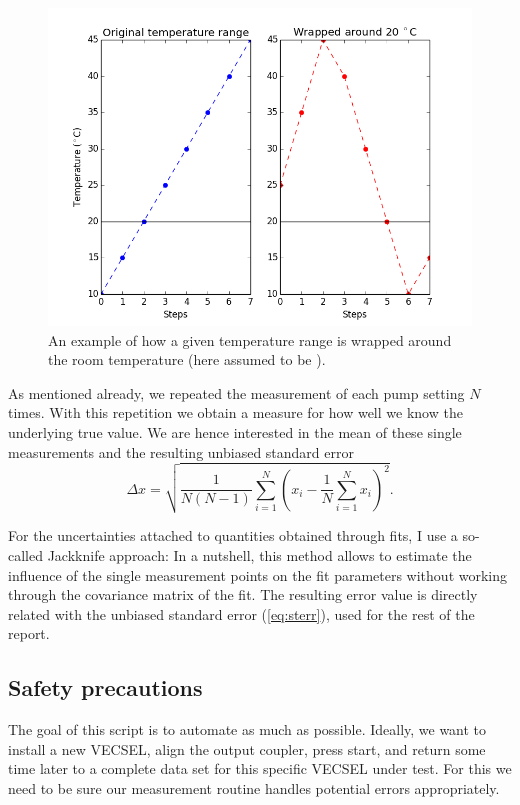 \begin{figure}
\centering
\includegraphics[width=12.5cm]{img/temp_wrap.png}
\caption{An example of how a given temperature range is wrapped around the room temperature
(here assumed to be ).}
\label{img:temproutine}
\end{figure}

As mentioned already,
we repeated the measurement of each pump setting
$N$ times.
With this repetition we obtain a measure
for how well we know
the underlying true value.
We are hence interested in
the mean of these single measurements and
the resulting unbiased standard error \cite{Barlow}
\begin{equation}
\Delta x = \sqrt{ \frac{1}{N(N-1)}
	\sum\limits_{i=1}^N (x_i - 
		\frac{1}{N} \sum\limits_{i=1}^N x_i )^2 }.
\label{eq:sterr}
\end{equation}

For the uncertainties attached to
quantities obtained through fits,
I use a so-called
Jackknife \cite{Efron1983} approach:
In a nutshell,
this method allows to estimate
the influence of the single measurement points
on the fit parameters
without working through
the covariance matrix of the fit.
The resulting error value
is directly related with the
unbiased standard error (\ref{eq:sterr}),
used for the rest of the report.

\subsection{Safety precautions}
\label{sec:routine:safety}

The goal of this script is to automate as much as possible.
Ideally,
we want to install a new VECSEL,
align the output coupler,
press start,
and return some time later to a complete data set
for this specific VECSEL under test.
For this we need to be sure
our measurement routine handles potential errors appropriately.

